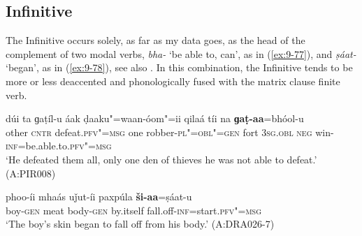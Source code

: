 \subsection{Infinitive}
\label{subsec:9-3-6}

The Infinitive occurs solely, as far as my data goes, as the head of the complement of two modal
verbs, \textit{bha-} `be able to, can', as in (\ref{ex:9-77}), and \textit{ṣáat-} `began', as in (\ref{ex:9-78}), see also
. In this combination, the Infinitive tends to be more or less deaccented and phonologically fused with the matrix clause finite verb.

\begin{exe}
\ex
\label{ex:9-77}
\gll dúi ta ɡaṭíl-u áak ḍaaku"=waan-óom"=ii qilaá tíi na \textbf{ɡaṭ-aa}=bhóol-u  \\
other \textsc{cntr} defeat.\textsc{pfv"=msg} one robber-\textsc{pl"=obl"=gen}  fort \textsc{3sg.obl} \textsc{neg} win-\textsc{inf}=be.able.to.\textsc{pfv"=msg} \\
\glt `He defeated them all, only one den of thieves he was not able to defeat.' (A:PIR008)

\ex
\label{ex:9-78}
\gll phoo-íi mhaás uǰut-íi paxpúla \textbf{ši-aa}=ṣáat-u \\
boy-\textsc{gen} meat body-\textsc{gen} by.itself fall.off-\textsc{inf}=start.\textsc{pfv"=msg} \\
\glt `The boy's skin began to fall off from his body.' (A:DRA026-7) 
\end{exe}